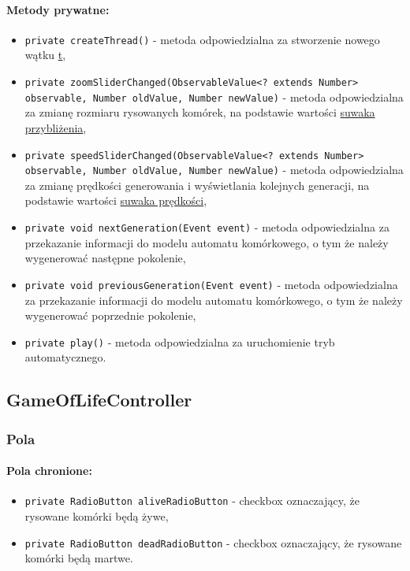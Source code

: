 \documentclass{report}
\begin{document}
\paragraph{Metody prywatne:}
\begin{itemize}
 	\item \texttt{private createThread()} - metoda odpowiedzialna za stworzenie nowego wątku \hyperref[sec:thread]{t},
 	\item \texttt{private zoomSliderChanged(ObservableValue<? extends Number> observable, Number oldValue, Number newValue)} - metoda odpowiedzialna za zmianę rozmiaru rysowanych komórek, na podstawie wartości \hyperref[sec:zoomSlider]{suwaka przybliżenia},
 	\item \texttt{private speedSliderChanged(ObservableValue<? extends Number> observable, Number oldValue, Number newValue)} - metoda odpowiedzialna za zmianę prędkości generowania i wyświetlania kolejnych generacji, na podstawie wartości \hyperref[sec:speedSlider]{suwaka prędkości},
 	\item \texttt{private void nextGeneration(Event event)} - metoda odpowiedzialna za przekazanie informacji do modelu automatu komórkowego, o tym że należy wygenerować następne pokolenie,
 	\item \texttt{private void previousGeneration(Event event)} - metoda odpowiedzialna za przekazanie informacji do modelu automatu komórkowego, o tym że należy wygenerować poprzednie pokolenie,
 	\item \texttt{private play()} - metoda odpowiedzialna za uruchomienie tryb automatycznego.
\end{itemize}

\subsection{GameOfLifeController}
\subsubsection{Pola}
\paragraph{Pola chronione:}
\begin{itemize}	\label{sec:checkbox}
	\item \texttt{private RadioButton aliveRadioButton} - checkbox oznaczający, że rysowane komórki będą żywe,
	\item \texttt{private RadioButton deadRadioButton} - checkbox oznaczający, że rysowane komórki będą martwe.
\end{itemize}
\end{document}
